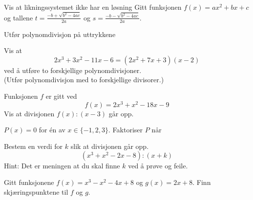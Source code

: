  \vs
{}
Vis at likningssystemet ikke har en løsning
\newpage
{}
Gitt funksjonen $ f(x)=ax^2+bx+c $ og tallene $ t=\frac{-b+\sqrt{b^2-4ac}}{2a} $ og $ s=\frac{-b-\sqrt{b^2-4ac}}{2a} $.

\nes
{}
Utfør polynomdivisjon på uttrykkene \os
{} \os
{}

Vis at
\[ 2x^3+3x^2-11x-6=(2x^2+7x+3)(x-2) \]
ved å utføre to forskjellige polynomdivisjoner. \\(Utfør polynomdivisjon med to forskjellige divisorer.)

Funksjonen $f$ er gitt ved
\[ f(x)=2x^3+x^2-18x-9 \]
Vis at divisjonen $f(x):(x-3)$ går opp.


\newpage

$ P(x)=0 $ for én av $ x\in\{-1, 2, 3\} $.
Faktoriser $ P $ når

Bestem en verdi for $k$ slik at divisjonen går opp.
\[ (x^3+x^2-2x-8):(x+k) \]
{\footnotesize Hint: Det er meningen at du skal finne $k$ ved å prøve og feile.}

Gitt funksjonene $f(x)=x^3-x^2-4x+8$ og $g(x)=2x+8$. Finn skjæringspunktene til $f$ og $g$.



